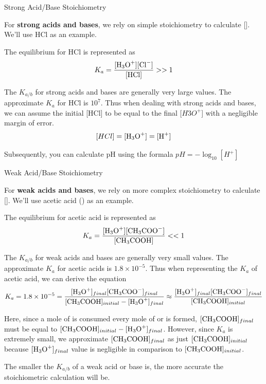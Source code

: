 \documentclass[10pt]{article}
\begin{document}
    \begin{core}{Strong Acid/Base Stoichiometry}
      
      For \textbf{strong acids and bases}, we rely on simple stoichiometry to calculate []. We'll use HCl as an example.


      The equilibrium for HCl is represented as 
      \[
        K_{a} = \frac{[\ce{H3O+}][\ce{Cl-}]}{[\ce{HCl}]} >> 1
      \]

      The $K_{a/b}$ for strong acids and bases are generally very large values. The approximate $K_a$ for HCl is $10^{7}$. Thus when dealing with strong acids and bases, we can assume the initial [HCl] to be equal to the final [$H3O^{+}$] with a negligible margin of error.
      \[
        [HCl] = [\ce{H3O+}] = [\ce{H+}]
      \]

      Subsequently, you can calculate pH using the formala $pH = -\log_{10}[H^{+}]$

    \end{core}

    \begin{core}{Weak Acid/Base Stoichiometry}
     
      For \textbf{weak acids and bases}, we rely on more complex stoichiometry to calculate []. We'll use acetic acid () as an example.


      The equilibrium for acetic acid is represented as 
      \[
        K_{a} = \frac{[\ce{H3O+}][\ce{CH3COO-}]}{[\ce{CH3COOH}]} << 1
      \]

      The $K_{a/b}$ for weak acids and bases are generally very small values. The approximate $K_a$ for acetic acids is $1.8 \times 10^{-5}$. Thus when representing the $K_a$ of acetic acid, we can derive the equation
      \[
        K_a = 1.8 \times 10^{-5} = \frac{[\ce{H3O+}]_{final}[\ce{CH3COO-}]_{final}}{[\ce{CH3COOH}]_{initial} - [\ce{H3O+}]_{final}} \approx \frac{[\ce{H3O^+}]_{final}[\ce{CH3COO-}]_{final}}{[\ce{CH3COOH}]_{initial}}
      \]

      Here, since a mole of  is consumed every mole of  or  is formed, $[\ce{CH3COOH}]_{final}$ must be equal to $[\ce{CH3COOH}]_{initial} - [\ce{H3O+}]_{final}$. However, since $K_a$ is extremely small, we approximate $[\ce{CH3COOH}]_{final}$ as just $[\ce{CH3COOH}]_{initial}$ because $[\ce{H3O+}]_{final}$ value is negligible in comparison to $[\ce{CH3COOH}]_{initial}$.

      The smaller the $K_{a/b}$ of a weak acid or base is, the more accurate the stoichiometric calculation will be.

    \end{core}
\end{document}
